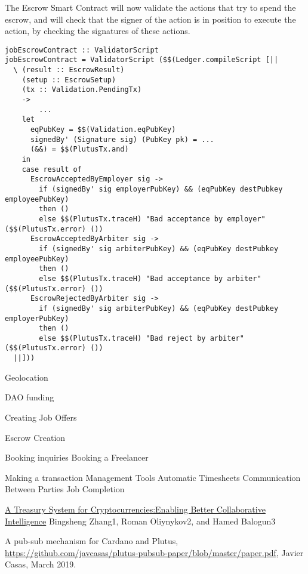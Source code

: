 \documentclass{article}
\begin{document}
The Escrow Smart Contract will now validate the actions that try to spend the escrow, and will check that the signer of the action is in position to execute the action, by checking the signatures of these actions.

\begin{verbatim}
jobEscrowContract :: ValidatorScript
jobEscrowContract = ValidatorScript ($$(Ledger.compileScript [||
  \ (result :: EscrowResult)
    (setup :: EscrowSetup)
    (tx :: Validation.PendingTx)
    ->
		...
    let
      eqPubKey = $$(Validation.eqPubKey)
      signedBy' (Signature sig) (PubKey pk) = ...
      (&&) = $$(PlutusTx.and)
    in
    case result of
      EscrowAcceptedByEmployer sig ->
        if (signedBy' sig employerPubKey) && (eqPubKey destPubkey employeePubKey)
        then ()
        else $$(PlutusTx.traceH) "Bad acceptance by employer" ($$(PlutusTx.error) ())
      EscrowAcceptedByArbiter sig ->
        if (signedBy' sig arbiterPubKey) && (eqPubKey destPubkey employeePubKey)
        then ()
        else $$(PlutusTx.traceH) "Bad acceptance by arbiter" ($$(PlutusTx.error) ())
      EscrowRejectedByArbiter sig ->
        if (signedBy' sig arbiterPubKey) && (eqPubKey destPubkey employerPubKey)
        then ()
        else $$(PlutusTx.traceH) "Bad reject by arbiter" ($$(PlutusTx.error) ())
  ||]))
\end{verbatim}


Geolocation

DAO funding


Creating Job Offers



Escrow Creation

Booking inquiries
Booking a Freelancer

Making a transaction
Management Tools
Automatic Timesheets
Communication Between Parties
Job Completion


\begin{thebibliography}{99}

\href{https://www.lancaster.ac.uk/staff/zhangb2/treasury.pdf}{A Treasury System for Cryptocurrencies:Enabling Better Collaborative Intelligence}
Bingsheng Zhang1, Roman Oliynykov2, and Hamed Balogun3

 A pub-sub mechanism for Cardano and Plutus, \url{https://github.com/javcasas/plutus-pubsub-paper/blob/master/paper.pdf}, Javier Casas, March 2019.

\end{thebibliography}
\end{document}
